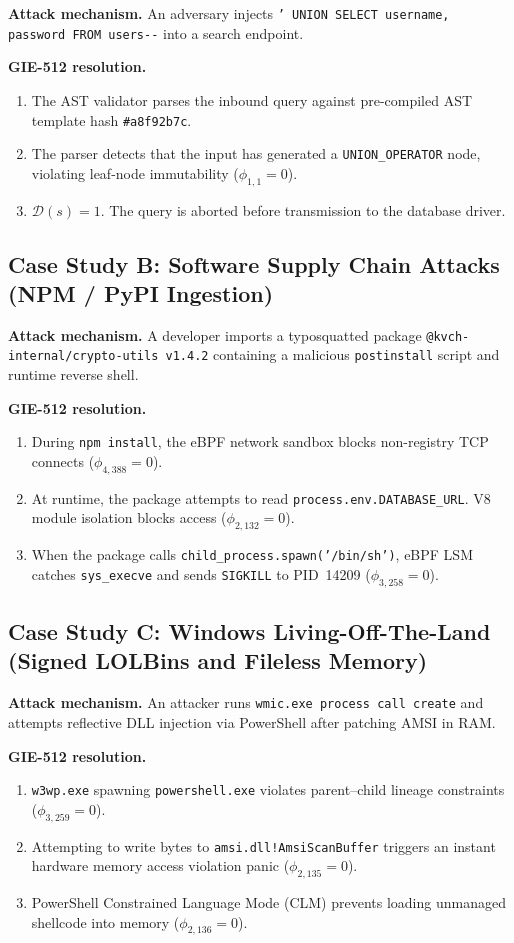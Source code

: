 \documentclass{portalciencia}
\theoremstyle{plain}
\theoremstyle{definition}
\begin{document}
\textbf{Attack mechanism.} An adversary injects \texttt{' UNION SELECT username, password FROM users-{}-} into a search endpoint.

\textbf{GIE-512 resolution.}
\begin{enumerate}
  \item The AST validator parses the inbound query against pre-compiled AST template hash \texttt{\#a8f92b7c}.
  \item The parser detects that the input has generated a \texttt{UNION\_OPERATOR} node, violating leaf-node immutability ($\phi_{1,1} = 0$).
  \item $\mathcal{D}(s) = 1$. The query is aborted before transmission to the database driver.
\end{enumerate}

\subsection{Case Study B: Software Supply Chain Attacks (NPM / PyPI Ingestion)}

\textbf{Attack mechanism.} A developer imports a typosquatted package \texttt{@kvch-internal/crypto-utils v1.4.2} containing a malicious \texttt{postinstall} script and runtime reverse shell.

\textbf{GIE-512 resolution.}
\begin{enumerate}
  \item During \texttt{npm install}, the eBPF network sandbox blocks non-registry TCP connects ($\phi_{4,388} = 0$).
  \item At runtime, the package attempts to read \texttt{process.env.DATABASE\_URL}. V8 module isolation blocks access ($\phi_{2,132} = 0$).
  \item When the package calls \texttt{child\_process.spawn('/bin/sh')}, eBPF LSM catches \texttt{sys\_execve} and sends \texttt{SIGKILL} to PID~14209 ($\phi_{3,258} = 0$).
\end{enumerate}

\subsection{Case Study C: Windows Living-Off-The-Land (Signed LOLBins and Fileless Memory)}

\textbf{Attack mechanism.} An attacker runs \texttt{wmic.exe process call create} and attempts reflective DLL injection via PowerShell after patching AMSI in RAM.

\textbf{GIE-512 resolution.}
\begin{enumerate}
  \item \texttt{w3wp.exe} spawning \texttt{powershell.exe} violates parent--child lineage constraints ($\phi_{3,259} = 0$).
  \item Attempting to write bytes to \texttt{amsi.dll!AmsiScanBuffer} triggers an instant hardware memory access violation panic ($\phi_{2,135} = 0$).
  \item PowerShell Constrained Language Mode (CLM) prevents loading unmanaged shellcode into memory ($\phi_{2,136} = 0$).
\end{enumerate}
\end{document}

